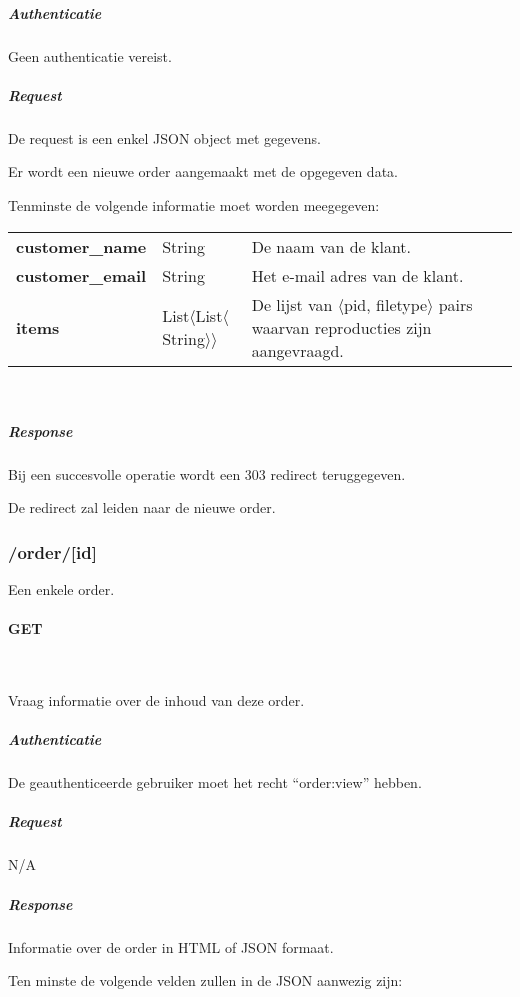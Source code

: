 \documentclass[a4paper,titlepage]{report}
\makeatletter
\def\namedlabel#1#2{
  \label{#1}
  \begingroup
   \def\@currentlabel{#2}%
   \label{#1:name}\endgroup
}
\makeatother
\begin{document}
          \subparagraph{Authenticatie}
            Geen authenticatie vereist.

          \subparagraph{Request}
            De request is een enkel JSON object met gegevens.

            Er wordt een nieuwe order aangemaakt met de opgegeven data.

            Tenminste de volgende informatie moet worden meegegeven:\\

            \begin{tabular}{ l l p{8cm} }
              \textbf{customer\_name} & String & De naam van de klant. \\
              \textbf{customer\_email} & String & Het e-mail adres van de
              klant. \\
              \textbf{items} & List$\langle$List$\langle$String$\rangle\rangle$ & De lijst van
              $\langle$pid, filetype$\rangle$ pairs waarvan reproducties
              zijn aangevraagd.\\
            \end{tabular}\hfill\\

          \subparagraph{Response}
            Bij een succesvolle operatie wordt een 303 redirect teruggegeven.

            De redirect zal leiden naar de nieuwe order.

      \pagebreak
      \subsubsection{/order/[id]}
      Een enkele order.

        \paragraph{GET}\hfill\\
          \namedlabel{api:order:get}{GET /order/[id]}
          Vraag informatie over de inhoud van deze order.

          \subparagraph{Authenticatie}
            De geauthenticeerde gebruiker moet het recht ``order:view''
            hebben.

          \subparagraph{Request} N/A

          \subparagraph{Response}
            Informatie over de order in HTML of JSON formaat.

            Ten minste de volgende velden zullen in de JSON aanwezig zijn:\\
\end{document}

